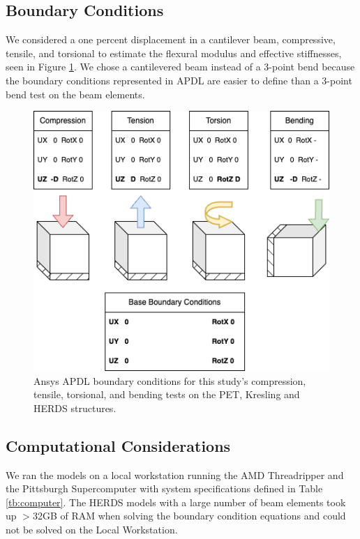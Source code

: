 \documentclass[11pt, a4paper]{article}
\begin{document}
\subsection{Boundary Conditions}
We considered a one percent displacement in a cantilever beam, compressive, tensile, and torsional to estimate the flexural modulus and effective stiffnesses, seen in Figure \ref{fig:boundary_cond}. We chose a cantilevered beam instead of a 3-point bend because the boundary conditions represented in APDL are easier to define than a 3-point bend test on the beam elements. 

\begin{figure}
    \centering
    \includegraphics[width=0.75\linewidth]{figures-sup/Supplementary - Boundary Conditions.drawio.png}
    \caption{Ansys APDL boundary conditions for this study's compression, tensile, torsional, and bending tests on the PET, Kresling and HERDS structures.}
    \label{fig:boundary_cond}
\end{figure}

\subsection{Computational Considerations}
We ran the models on a local workstation running the AMD Threadripper and the Pittsburgh Supercomputer with system specifications defined in Table \ref{tb:computer}. The HERDS models with a large number of beam elements took up $>$32GB of RAM when solving the boundary condition equations and could not be solved on the Local Workstation.
\end{document}

